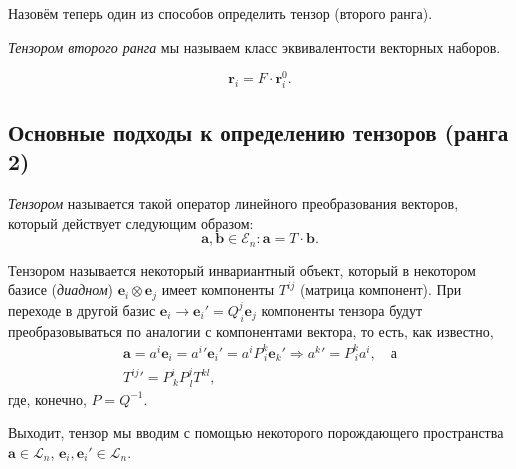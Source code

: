 Назовём теперь один из способов определить тензор (второго ранга).
\begin{definition}
  \emph{Тензором второго ранга} мы называем класс эквивалентости векторных наборов.
\end{definition}

\[
  \mathbf{r}_i = F \cdot \mathbf{r}_i^0.
\]



\subsection{Основные подходы к определению тензоров (ранга 2)}
\begin{definition}[алгебраическое]
  \label{tensor-def}
  \emph{Тензором} называется такой оператор линейного преобразования векторов,
  который действует следующим образом:
  \[
    \mathbf{a}, \mathbf{b} \in \mathcal{E}_n\colon \mathbf{a} = T \cdot \mathbf{b}.
  \]
\end{definition}

\renewcommand{\thedefinition}{\ref{tensor-def}$'$}
\addtocounter{definition}{-1}
\begin{definition}
  Тензором называется некоторый инвариантный объект, который в некотором базисе
  (\emph{диадном}) $\mathbf{e}_i \otimes \mathbf{e}_j$ имеет компоненты $T^{ij}$ (матрица компонент).
  При переходе в другой базис $\mathbf{e}_i \to \mathbf{e}_i' = Q^j_{\, i} \mathbf{e}_j$ компоненты тензора
  будут преобразовываться по аналогии с компонентами вектора, то есть, как
  известно,
  \begin{gather*}
    \mathbf{a} = a^i \mathbf{e}_i = {a^i}' {\mathbf{e}_i}' = a^i P^k_{\,i} \mathbf{e}_k'
    \Rightarrow
    {a^k}' = P^k_{\, i} a^i, \quad \text{а}\\
    {T^{ij}}' = P^i_{\, k} P^j_{\, l} T^{kl},
  \end{gather*}
  где, конечно, $ P = Q^{-1} $.
\end{definition}
\renewcommand{\thedefinition}{\arabic{definition}}

Выходит, тензор мы вводим с помощью некоторого порождающего пространства
$\mathbf{a} \in \mathcal{L}_n$, $\mathbf{e}_i, \mathbf{e}_i' \in \mathcal{L}_n$.

